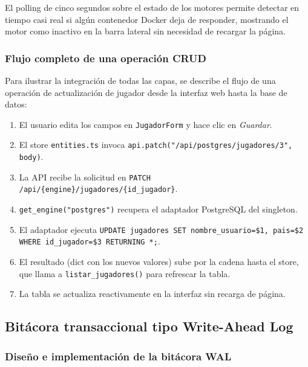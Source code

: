 \documentclass[12pt,letterpaper]{article}
\begin{document}
El polling de cinco segundos sobre el estado de los motores permite detectar en tiempo casi
real si algún contenedor Docker deja de responder, mostrando el motor como inactivo en la
barra lateral sin necesidad de recargar la página.

\subsubsection{Flujo completo de una operación CRUD}

Para ilustrar la integración de todas las capas, se describe el flujo de una operación de
actualización de jugador desde la interfaz web hasta la base de datos:

\begin{enumerate}[leftmargin=2em]
  \item El usuario edita los campos en \texttt{JugadorForm} y hace clic en \emph{Guardar}.
  \item El store \texttt{entities.ts} invoca \texttt{api.patch("/api/postgres/jugadores/3", body)}.
  \item La API recibe la solicitud en \texttt{PATCH /api/\{engine\}/jugadores/\{id\_jugador\}}.
  \item \texttt{get\_engine("postgres")} recupera el adaptador PostgreSQL del singleton.
  \item El adaptador ejecuta
        \texttt{UPDATE jugadores SET nombre\_usuario=\$1, pais=\$2 WHERE id\_jugador=\$3 RETURNING *;}.
  \item El resultado (dict con los nuevos valores) sube por la cadena hasta el store, que
        llama a \texttt{listar\_jugadores()} para refrescar la tabla.
  \item La tabla se actualiza reactivamente en la interfaz sin recarga de página.
\end{enumerate}


\subsection{Bitácora transaccional tipo Write-Ahead Log}

\subsubsection{Diseño e implementación de la bitácora WAL}
\end{document}
